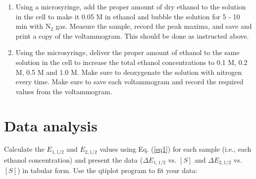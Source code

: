 \documentclass[byrevtex,amssymb,aps,pra,floatfix,letterpaper]{revtex4}
\begin{document}
\begin{enumerate}
\item Using a microsyringe, add the proper amount of dry ethanol to the solution in the cell to make it 0.05 M in ethanol and bubble the solution for 5 - 10 min with N$_2$ gas. Measure the sample, record the peak maxima, and save and print a copy of the voltammogram. This should be done as instructed above.

\item Using the microsyringe, deliver the proper amount of ethanol to the same solution in the cell to increase the total ethanol concentrations to 0.1 M, 0.2 M, 0.5 M and 1.0 M. Make sure to deoxygenate the solution with nitrogen every time. Make sure to save each voltammogram and record the required values from the voltammogram.

\end{enumerate}

\section{Data analysis}

Calculate the $E_{1,1/2}$ and $E_{2,1/2}$ values using Eq. (\ref{eq1}) for each sample (i.e., each ethanol concentration) and present the data ($\Delta E_{1,1/2}$ vs. $\left[S\right]$ and $\Delta E_{2,1/2}$ vs. $\left[S\right]$) in tabular form. Use the qtiplot program to fit your data:
\end{document}
